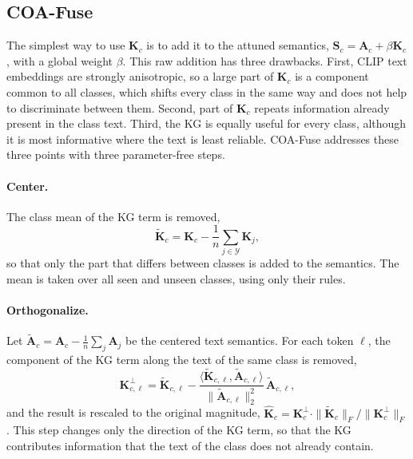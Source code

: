 \documentclass[11pt]{article}
\begin{document}
\subsection{COA-Fuse}
\label{sec:coa}

The simplest way to use $\mathbf{K}_c$ is to add it to the attuned semantics, $\mathbf{S}_c = \mathbf{A}_c + \beta \mathbf{K}_c$, with a global weight $\beta$. This raw addition has three drawbacks. First, CLIP text embeddings are strongly anisotropic, so a large part of $\mathbf{K}_c$ is a component common to all classes, which shifts every class in the same way and does not help to discriminate between them. Second, part of $\mathbf{K}_c$ repeats information already present in the class text. Third, the KG is equally useful for every class, although it is most informative where the text is least reliable. COA-Fuse addresses these three points with three parameter-free steps.

\paragraph{Center.}
The class mean of the KG term is removed,
\begin{equation}
  \tilde{\mathbf{K}}_c = \mathbf{K}_c - \frac{1}{n} \sum_{j \in \mathcal{Y}} \mathbf{K}_j ,
  \label{eq:center}
\end{equation}
so that only the part that differs between classes is added to the semantics. The mean is taken over all seen and unseen classes, using only their rules.

\paragraph{Orthogonalize.}
Let $\tilde{\mathbf{A}}_c = \mathbf{A}_c - \frac{1}{n}\sum_{j} \mathbf{A}_j$ be the centered text semantics. For each token $\ell$, the component of the KG term along the text of the same class is removed,
\begin{equation}
  \mathbf{K}^{\perp}_{c,\ell} = \tilde{\mathbf{K}}_{c,\ell} - \frac{\langle \tilde{\mathbf{K}}_{c,\ell}, \tilde{\mathbf{A}}_{c,\ell} \rangle}{\|\tilde{\mathbf{A}}_{c,\ell}\|_2^2}\, \tilde{\mathbf{A}}_{c,\ell} ,
  \label{eq:orth}
\end{equation}
and the result is rescaled to the original magnitude, $\hat{\mathbf{K}}_c = \mathbf{K}^{\perp}_c \cdot \|\tilde{\mathbf{K}}_c\|_F / \|\mathbf{K}^{\perp}_c\|_F$. This step changes only the direction of the KG term, so that the KG contributes information that the text of the class does not already contain.
\end{document}
